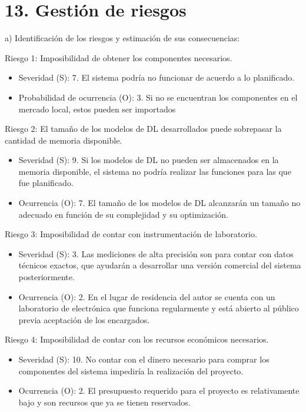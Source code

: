 \documentclass[
11pt, %
]{plan}
\begin{document}
\section{13. Gestión de riesgos}
\label{sec:riesgos}

a) Identificación de los riesgos y estimación de sus consecuencias:

Riesgo 1: Imposibilidad de obtener los componentes necesarios.
\begin{itemize}
	\item Severidad (S): 7. El sistema podría no funcionar de acuerdo a lo planificado.
	\item Probabilidad de ocurrencia (O): 3. Si no se encuentran los componentes en el mercado local, estos pueden ser importados
\end{itemize} 

Riesgo 2: El tamaño de los modelos de DL desarrollados puede sobrepasar la cantidad de memoria disponible.
\begin{itemize}
	\item Severidad (S): 9. Si los modelos de DL no pueden ser almacenados en la memoria disponible, el sistema no podría realizar las funciones para las que fue planificado.
	\item Ocurrencia (O): 7. El tamaño de los modelos de DL alcanzarán un tamaño no adecuado en función de su complejidad y su optimización.
\end{itemize}

Riesgo 3: Imposibilidad de contar con instrumentación de laboratorio.
\begin{itemize}
	\item Severidad (S): 3. Las mediciones de alta precisión son para contar con datos técnicos exactos, que ayudarán a desarrollar una versión comercial del sistema posteriormente.
	\item Ocurrencia (O): 2. En el lugar de residencia del autor se cuenta con un laboratorio de electrónica que funciona regularmente y está abierto al público previa aceptación de los encargados.
\end{itemize}

Riesgo 4: Imposibilidad de contar con los recursos económicos necesarios.
\begin{itemize}
	\item Severidad (S): 10. No contar con el dinero necesario para comprar los componentes del sistema impediría la realización del proyecto.
	\item Ocurrencia (O): 2. El presupuesto requerido para el proyecto es relativamente bajo y son recursos que ya se tienen reservados.
\end{itemize}
\end{document}
